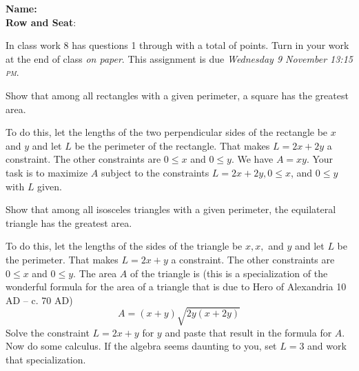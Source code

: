 \documentclass[12pt,fleqn]{exam}
\newcommand\PM{\textsc{pm}}
\newcommand{\quiz}{8}
\newcommand{\term}{Fall}
\newcommand{\due}{Wednesday 9 November 13:15 \PM}
\newcommand{\class}{MATH 115}
\begin{document}
\large
\vspace{0.1in}
\noindent\makebox[3.0truein][l]{\textbf{\class}}
\textbf{Name:} \hrulefill \\
\noindent \makebox[3.0truein][l]{\textbf{In class work \quiz, \term \/ \the\year}}
\textbf{Row and Seat}:\hrulefill\\
\vspace{0.1in}


\noindent  In class work  \quiz\/  has questions 1 through  \numquestions \/ with a total of  \numpoints\/  points.   
Turn in your work at the end of class  \emph{on paper}. This assignment is due \emph{\due}.

\vspace{0.1in}


\begin{questions} 

    \question [5] Show that among all rectangles with a given perimeter,
    a square has the greatest area. 
    
    \quad To do this, let the lengths of the two perpendicular sides of the 
     rectangle be $x$ and $y$ and let $L$ be the perimeter of the
     rectangle. That makes $L = 2 x + 2 y$ a constraint. The other 
     constraints are $0 \leq x$ and $0 \leq y$.  We have $A = xy$.  Your task is to 
     maximize $A$ subject to the constraints $L = 2 x + 2 y, 0 \leq x$,
     and $0 \leq y$ with $L$  given.

    \newpage

    \question Show that among all isosceles triangles with a given
    perimeter, the equilateral triangle has the greatest area.

    \quad To do this, let the lengths of the sides of the triangle be $x,x,$
    and $y$ and let $L$ be the perimeter. That makes $L = 2 x + y$ a
    constraint. The other constraints are $0 \leq x$ and $0 \leq y$.
    The area $A$ of the triangle is (this is a specialization of 
    the wonderful formula for the area of a triangle that is due to Hero of Alexandria 
    10 AD – c. 70 AD)
    \begin{equation*}
        A = (x+y) \sqrt{2 y (x + 2 y)}
    \end{equation*}
    Solve the constraint $L = 2 x + y$ for $y$ and paste that
    result in  the formula for $A$. Now do some calculus.
    \quad If the algebra seems daunting to you, set $L = 3$ and work
    that specialization. 


   
\end{questions}
\end{document}
